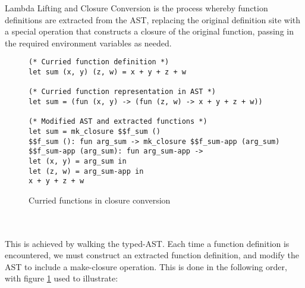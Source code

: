 Lambda Lifting and Closure Conversion is the process whereby function definitions are extracted from the AST, replacing the original definition site with a special operation that constructs a closure of the original function, passing in the required environment variables as needed.
\begin{figure}[h]
\begin{verbatim}
(* Curried function definition *)
let sum (x, y) (z, w) = x + y + z + w

(* Curried function representation in AST *)
let sum = (fun (x, y) -> (fun (z, w) -> x + y + z + w))

(* Modified AST and extracted functions *)
let sum = mk_closure $$f_sum ()
$$f_sum (): fun arg_sum -> mk_closure $$f_sum-app (arg_sum)
$$f_sum-app (arg_sum): fun arg_sum-app ->
let (x, y) = arg_sum in
let (z, w) = arg_sum-app in
x + y + z + w
\end{verbatim}
\caption{Curried functions in closure conversion}
\label{fig:curried}
\end{figure}
\\\\
This is achieved by walking the typed-AST. Each time a function definition is encountered, we must construct an extracted function definition, and modify the AST to include a make-closure operation. This is done in the following order, with figure \ref{fig:curried} used to illustrate:
